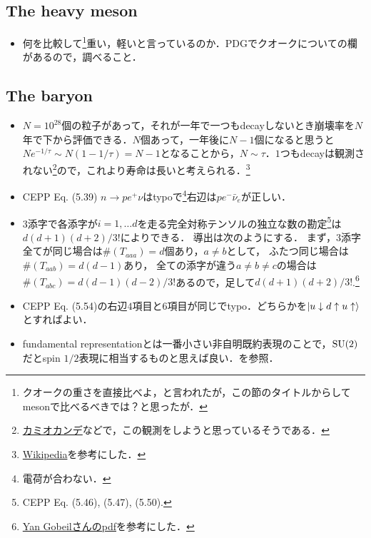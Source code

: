 \subsection{The heavy meson}
\begin{itemize}
		\item 何を比較して\footnote{クオークの重さを直接比べよ，と言われたが，この節のタイトルからしてmesonで比べるべきでは？と思ったが．}重い，軽いと言っているのか．PDGでクオークについての欄があるので，調べること．
\end{itemize}
\subsection{The baryon}
\begin{itemize}
		\item $N=10^{28} $個の粒子があって，それが一年で一つもdecayしないとき崩壊率を$N $年で下から評価できる．$N $個あって，一年後に$N-1 $個になると思うと$Ne^{-1/\tau} \sim N( 1 - 1/\tau) = N-1 $となることから，$N\sim \tau $．$1 $つもdecayは観測されない\footnote{\href{https://www-sk.icrr.u-tokyo.ac.jp/sk/about/research/}{カミオカンデ}などで，この観測をしようと思っているそうである．}ので，これより寿命は長いと考えられる．\footnote{\href{https://ja.wikipedia.org/wiki/\%E9\%99\%BD\%E5\%AD\%90\#cite\_note-11}{Wikipedia}を参考にした．}
		\item CEPP Eq. (5.39) $n \to pe^{+}\nu $はtypoで\footnote{電荷が合わない．}右辺は$pe^{-}\bar{\nu}_e $が正しい．
		\item 3添字で各添字が$i=1, \ldots d $を走る完全対称テンソルの独立な数の勘定\footnote{CEPP Eq. (5.46), (5.47), (5.50).}は$d(d+1)(d+2)/3! $によりできる．
				導出は次のようにする．
				まず，$3 $添字全てが同じ場合は$\#(T_{aaa}) = d $個あり，$a\neq  b $として，
				ふたつ同じ場合は$\#(T_{aab}) = d(d-1)$あり，
				全ての添字が違う$a\neq b \neq c $の場合は$\#(T_{abc}) = d(d-1)(d-2)/3! $あるので，足して$d(d+1)(d+2)/3! $.\footnote{\href{http://www.physics.mcgill.ca/~yangob/symmetric\%20tensor.pdf}{Yan Gobeilさんのpdf}を参考にした．}
		\item CEPP Eq. (5.54)の右辺$4 $項目と$6 $項目が同じでtypo．どちらかを$\ket{u\downarrow d\uparrow u\uparrow} $とすればよい．
		\item fundamental representationとは一番小さい非自明既約表現のことで，$\mathrm{SU}(2) $だとspin $1/2 $表現に相当するものと思えば良い．\cite{BB03663366}を参照．
\end{itemize}
